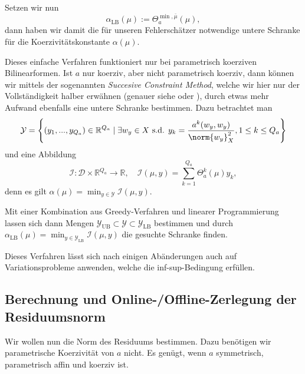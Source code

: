 Setzen wir nun
\begin{equation}
    \alpha_\text{LB}(\mu) := \Theta_a^{\min, \bar \mu}(\mu),
\end{equation}
dann haben wir damit die für unseren Fehlerschätzer notwendige untere Schranke für die Koerzivitätskonstante $\alpha(\mu)$.

Dieses einfache Verfahren funktioniert nur bei parametrisch koerziven Bilinearformen. Ist $a$ nur koerziv, aber nicht parametrisch koerziv, dann können wir mittels der sogenannten \emph{Succesive Constraint Method}, welche wir hier nur der Vollständigkeit halber erwähnen (genauer siehe \cite{Stamm} oder \cite{huynh2007successive}), durch etwas mehr Aufwand ebenfalls eine untere Schranke bestimmen. Dazu betrachtet man
\begin{equation}
    \mathcal Y = \left\{ (y_1, ..., y_{Q_a}) \in \mathbb{R}^{Q_a} \mid \exists w_y \in X \text{ s.d. } y_k = \frac{a^k(w_y, w_y)}{\norm{w_y}^2_X}, 1 \leq k \leq Q_a \right\}
\end{equation}
und eine Abbildung
\begin{equation}
    \mathcal I \colon \mathcal D \times \mathbb{R}^{Q_a} \to \mathbb{R}, \quad \mathcal I(\mu, y) = \sum_{k=1}^{Q_a} \Theta^k_a(\mu) y_k,
\end{equation}
 denn es gilt $\alpha(\mu) = \min_{y \in \mathcal Y} \mathcal I(\mu, y)$.

Mit einer Kombination aus Greedy-Verfahren und linearer Programmierung lassen sich dann Mengen $\mathcal Y_\text{UB} \subset \mathcal Y \subset \mathcal Y_\text{LB}$ bestimmen und durch $\alpha_\text{LB}(\mu) = \min_{y \in \mathcal Y_\text{LB}} \mathcal I(\mu, y)$ die gesuchte Schranke finden.

Dieses Verfahren lässt sich nach einigen Abänderungen auch auf Variationsprobleme anwenden, welche die inf-sup-Bedingung erfüllen.


\subsection{Berechnung und Online-/Offline-Zerlegung der Residuumsnorm} %
\label{sub:online_offline_zerlegung_von_norm}

Wir wollen nun die Norm des Residuums bestimmen.
Dazu benötigen wir parametrische Koerzivität von $a$ nicht.
Es genügt, wenn $a$ symmetrisch, parametrisch affin und koerziv ist.

